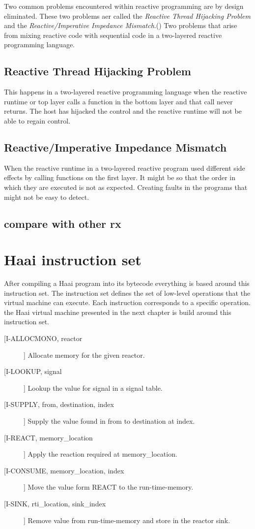 \documentclass[a4paper]{book}
\begin{document}
 Two common problems encountered within reactive programming are by design eliminated. These two problems aer called the \textit{Reactive Thread Hijacking Problem} and the \textit{Reactive/Imperative Impedance Mismatch}.(\cite{vonder_tackling_2020}) Two problems that arise from mixing reactive code with sequential code in a two-layered reactive programming language. 

\subsection*{Reactive Thread Hijacking Problem}
This happens in a two-layered reactive programming language when the reactive runtime or top layer calls a function in the bottom layer and that call never returns. The host has hijacked the control and the reactive runtime will not be able to regain control.  

\subsection*{Reactive/Imperative Impedance Mismatch}
When the reactive runtime in a two-layered reactive program used different side effects by calling functions on the first layer. It might be so that the order in which they are executed is not as expected. Creating faults in the programs that might not be easy to detect.
\subsection{compare with other rx}
\section{Haai instruction set}
After compiling a Haai program into its bytecode everything is based around this instruction set. The instruction set defines the set of low-level operations that the virtual machine can execute. Each instruction corresponds to a specific operation. the Haai virtual machine presented in the next chapter is build around this instruction set. 


\begin{description}
	\item[[I-ALLOCMONO, reactor]] Allocate memory for the given reactor.
	\item[[I-LOOKUP, signal]] Lookup the value for signal in a signal table.
	\item[[I-SUPPLY, from, destination, index]] Supply the value found in from to destination at index.
	\item[[I-REACT, memory\_location]] Apply the reaction required at memory\_location.
	\item[[I-CONSUME, memory\_location, index]] Move the value form REACT to the run-time-memory.
	\item[[I-SINK, rti\_location, sink\_index]] Remove value from run-time-memory and store in the reactor sink.
\end{description}
\end{document}
